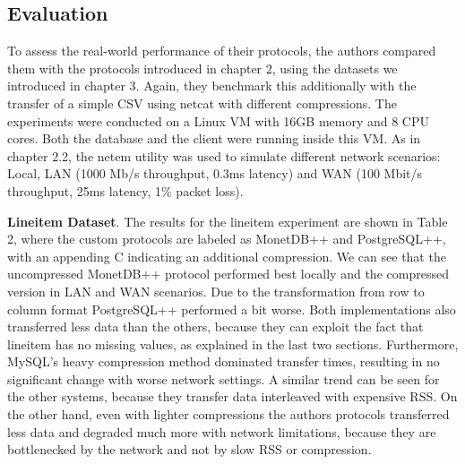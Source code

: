 \documentclass[sigconf]{acmart}
\begin{document}
\subsection{Evaluation}
To assess the real-world performance of their protocols, the authors compared them with the protocols introduced in chapter 2, using the datasets we introduced in chapter 3. Again, they benchmark this additionally with the transfer of a simple CSV using netcat with different compressions. The experiments were conducted on a Linux VM with 16GB memory and 8 CPU cores. Both the database and the client were running inside this VM. As in chapter 2.2, the netem utility was used to simulate different network scenarios: Local, LAN (1000 Mb/s throughput, 0.3ms latency) and WAN (100 Mbit/s throughput, 25ms latency, 1\% packet loss).

\textbf{Lineitem Dataset}.
The results for the lineitem experiment are shown in Table 2, where the custom protocols are labeled as MonetDB++ and PostgreSQL++, with an appending C indicating an additional compression. We can see that the uncompressed MonetDB++ protocol performed best locally and the compressed version in LAN and WAN scenarios. Due to the transformation from row to column format PostgreSQL++ performed a bit worse. Both implementations also transferred less data than the others, because they can exploit the fact that lineitem has no missing values, as explained in the last two sections. Furthermore, MySQL's heavy compression method dominated transfer times, resulting in no significant change with worse network settings. A similar trend can be seen for the other systems, because they transfer data interleaved with expensive RSS. On the other hand, even with lighter compressions the authors protocols transferred less data and degraded much more with network limitations, because they are bottlenecked by the network and not by slow RSS or compression. 
\end{document}
